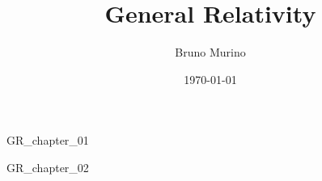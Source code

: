 \documentclass{_mypackages/monograph}
\title{General Relativity} %
\author{Bruno Murino} %
\date{\today} %
\begin{document}
\frontmatter

\monographtp
\dominitoc
\doparttoc
\pagestyle{onlypagenum}
\tableofcontents
\mainmatter

{GR_chapter_01} %

{GR_chapter_02} %


\backmatter
\printbib
\end{document}

